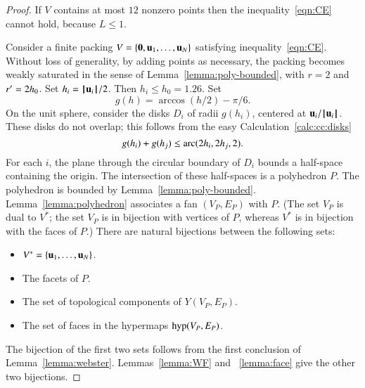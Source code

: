 \begin{proof} If $ V$ contains at most $12$ nonzero points then
the inequality~\ref{eqn:CE} cannot hold, because $L\le 1$.

Consider a finite packing $ V=\{{\mathbf 0}, {\mathbf u}_1,\ldots, {\mathbf u}_N\}$ satisfying inequality~\ref{eqn:CE}.   Without loss of generality, by adding points as necessary, the packing becomes weakly saturated in the sense of Lemma~\ref{lemma:poly-bounded}, with $r=2$ and $r'=2{h_0}$.  Set $h_i = {{\hskip0.1em|\hskip-0.15em|\hskip0.1em} {\mathbf u}_i{\hskip0.1em|\hskip-0.15em|\hskip0.1em}}/2$.  Then $h_i\le h_0=1.26$.  Set
\begin{displaymath}%
g(h) = \arccos(h/2) - \pi/6.  %
\end{displaymath}%
On the unit sphere,  consider the disks $D_i$ of radii $g(h_i)$, centered at $ {\mathbf u}_i/{{\hskip0.1em|\hskip-0.15em|\hskip0.1em} {\mathbf u}_i{\hskip0.1em|\hskip-0.15em|\hskip0.1em}}$.  These disks do not overlap; this follows from the easy Calculation~\ref{calc:cc:disks} %
\begin{displaymath}%
g(h_i) + g(h_j) \le \op{arc}(2h_i,2h_j,2).%
\end{displaymath}%
%
For each $i$, the plane through the circular boundary of $D_i$ bounds a half-space containing the origin.  The intersection of these half-spaces is a polyhedron $P$.  The polyhedron is bounded by Lemma~\ref{lemma:poly-bounded}.   Lemma~\ref{lemma:polyhedron} associates a fan $(V_P,E_P)$ with $P$.    (The set $V_P$ is dual to $ V^*$; the set $V_P$ is in bijection with vertices of $P$, whereas $ V^*$ is in bijection with the faces of $P$.)  There are natural bijections between the following sets:
\begin{itemize}
\item $ V^* = \{ {\mathbf u}_1,\ldots, {\mathbf u}_N\}$.
\item The  facets of $P$.
\item The set of  topological components of $Y(V_P,E_P)$.
\item The set of faces in the hypermaps ${\operatorname{hyp}}(V_P,E_P)$.
\end{itemize}
The bijection of the first two sets follows from the first conclusion of Lemma~\ref{lemma:webster}.
Lemmas~\ref{lemma:WF} and ~\ref{lemma:face} give the other two bijections.


\end{proof}
